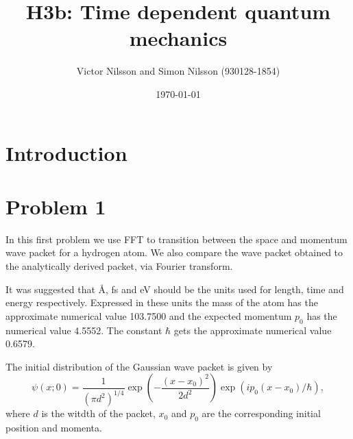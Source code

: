



\title{H3b: Time dependent quantum mechanics}
\author{Victor Nilsson and Simon Nilsson (930128-1854)}
\date{\today}





\section*{Introduction}

\section*{Problem 1}

In this first problem we use FFT to transition between the space and momentum wave packet for a hydrogen atom. We also compare the wave packet obtained to the analytically derived packet, via Fourier transform.

It was suggested that \AA, fs and eV should be the units used for length, time and energy respectively. Expressed in these units the mass of the atom has the approximate numerical value 103.7500 and the expected momentum $p_0$ has the numerical value 4.5552. The constant $\hbar$ gets the approximate numerical value 0.6579.

The initial distribution of the Gaussian wave packet is given by
\begin{equation}
	\psi(x;0)=\frac{1}{(\pi d^2)^{1/4}} \exp(-\frac{(x-x_0)^2}{2d^2}) \exp(i p_0(x-x_0)/\hbar),
\end{equation}
where $d$ is the witdth of the packet, $x_0$ and $p_0$ are the corresponding initial position and momenta.



